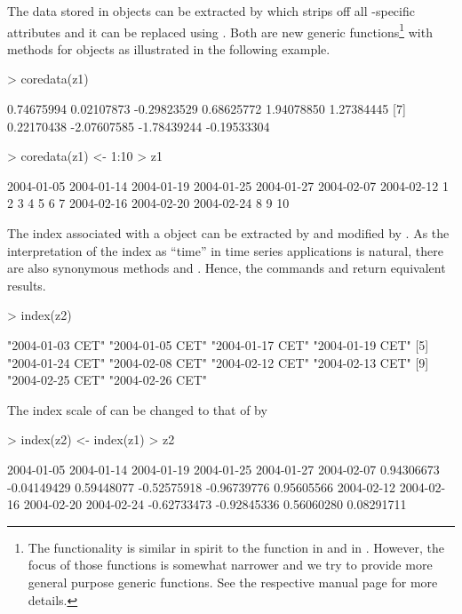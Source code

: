 \documentclass{Z}
\begin{document}
The data stored in  objects can be extracted by
 which strips off all -specific attributes and 
it can be replaced using . Both are new generic
functions\footnote{The  functionality is similar in spirit to the 
function in  and  in . However, the 
focus of those functions is somewhat narrower and we try to provide 
more general purpose generic functions. See the respective manual
page for more details.}
with methods for  objects as illustrated in the following
example.
\begin{Schunk}
\begin{Sinput}
> coredata(z1)
\end{Sinput}
\begin{Soutput}
 [1]  0.74675994  0.02107873 -0.29823529  0.68625772  1.94078850  1.27384445
 [7]  0.22170438 -2.07607585 -1.78439244 -0.19533304
\end{Soutput}
\begin{Sinput}
> coredata(z1) <- 1:10
> z1
\end{Sinput}
\begin{Soutput}
2004-01-05 2004-01-14 2004-01-19 2004-01-25 2004-01-27 2004-02-07 2004-02-12 
         1          2          3          4          5          6          7 
2004-02-16 2004-02-20 2004-02-24 
         8          9         10 
\end{Soutput}
\end{Schunk}

The index associated with a  object can be extracted
by  and modified by . As the interpretation
of the index as ``time'' in time series applications is natural,
there are also synonymous methods  and . 
Hence, the commands  and 
return equivalent results.
\begin{Schunk}
\begin{Sinput}
> index(z2)
\end{Sinput}
\begin{Soutput}
 [1] "2004-01-03 CET" "2004-01-05 CET" "2004-01-17 CET" "2004-01-19 CET"
 [5] "2004-01-24 CET" "2004-02-08 CET" "2004-02-12 CET" "2004-02-13 CET"
 [9] "2004-02-25 CET" "2004-02-26 CET"
\end{Soutput}
\end{Schunk}
The index scale of  can be changed to that of  by
\begin{Schunk}
\begin{Sinput}
> index(z2) <- index(z1)
> z2
\end{Sinput}
\begin{Soutput}
 2004-01-05  2004-01-14  2004-01-19  2004-01-25  2004-01-27  2004-02-07 
 0.94306673 -0.04149429  0.59448077 -0.52575918 -0.96739776  0.95605566 
 2004-02-12  2004-02-16  2004-02-20  2004-02-24 
-0.62733473 -0.92845336  0.56060280  0.08291711 
\end{Soutput}
\end{Schunk}
\end{document}
